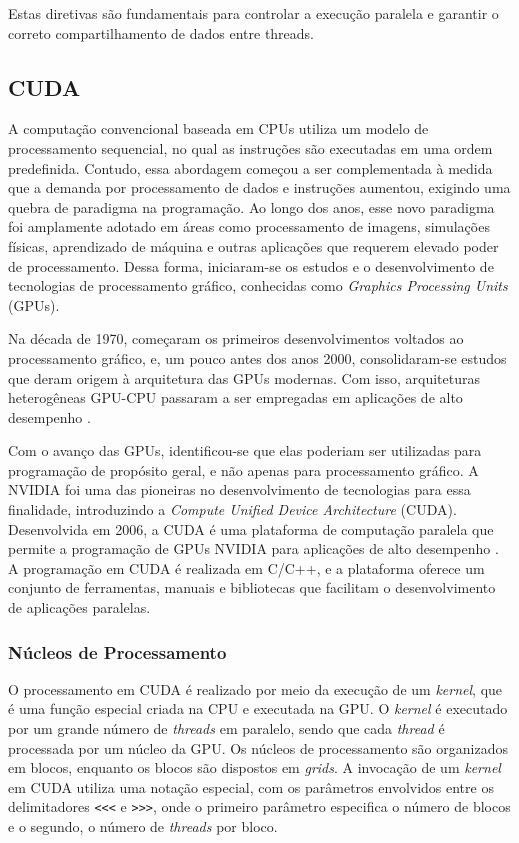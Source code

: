 \documentclass[12pt]{article}
\begin{document}
Estas diretivas são fundamentais para controlar a execução paralela e garantir o correto compartilhamento de dados entre threads.


\subsection{CUDA}
A computação convencional baseada em CPUs utiliza um modelo de processamento sequencial, no qual as instruções são executadas em uma ordem predefinida. Contudo, essa abordagem começou a ser complementada à medida que a demanda por processamento de dados e instruções aumentou, exigindo uma quebra de paradigma na programação. Ao longo dos anos, esse novo paradigma foi amplamente adotado em áreas como processamento de imagens, simulações físicas, aprendizado de máquina e outras aplicações que requerem elevado poder de processamento. Dessa forma, iniciaram-se os estudos e o desenvolvimento de tecnologias de processamento gráfico, conhecidas como \emph{Graphics Processing Units} (GPUs).

Na década de 1970, começaram os primeiros desenvolvimentos voltados ao processamento gráfico, e, um pouco antes dos anos 2000, consolidaram-se estudos que deram origem à arquitetura das GPUs modernas. Com isso, arquiteturas heterogêneas GPU-CPU passaram a ser empregadas em aplicações de alto desempenho \cite{cheng:2014}. 

Com o avanço das GPUs, identificou-se que elas poderiam ser utilizadas para programação de propósito geral, e não apenas para processamento gráfico. A NVIDIA foi uma das pioneiras no desenvolvimento de tecnologias para essa finalidade, introduzindo a \emph{Compute Unified Device Architecture} (CUDA). Desenvolvida em 2006, a CUDA é uma plataforma de computação paralela que permite a programação de GPUs NVIDIA para aplicações de alto desempenho \cite{cuda:2012}. A programação em CUDA é realizada em C/C++, e a plataforma oferece um conjunto de ferramentas, manuais e bibliotecas que facilitam o desenvolvimento de aplicações paralelas.

\subsubsection{Núcleos de Processamento} \label{subsubsec:cuda_cores}
O processamento em CUDA é realizado por meio da execução de um \emph{kernel}, que é uma função especial criada na CPU e executada na GPU. O \emph{kernel} é executado por um grande número de \emph{threads} em paralelo, sendo que cada \emph{thread} é processada por um núcleo da GPU. Os núcleos de processamento são organizados em blocos, enquanto os blocos são dispostos em \emph{grids}. A invocação de um \emph{kernel} em CUDA utiliza uma notação especial, com os parâmetros envolvidos entre os delimitadores \texttt{<<<} e \texttt{>>>}, onde o primeiro parâmetro especifica o número de blocos e o segundo, o número de \emph{threads} por bloco.
\end{document}
